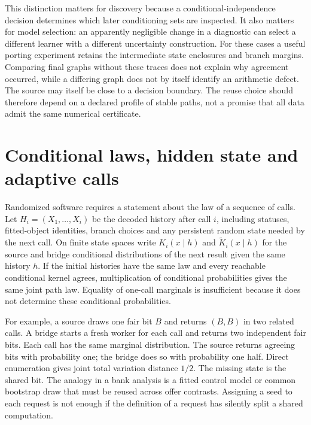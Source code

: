 This distinction matters for discovery because a conditional-independence
decision determines which later conditioning sets are inspected. It also
matters for model selection: an apparently negligible change in a diagnostic
can select a different learner with a different uncertainty construction.
For these cases a useful porting experiment retains the intermediate state
enclosures and branch margins. Comparing final graphs without these traces
does not explain why agreement occurred, while a differing graph does not by
itself identify an arithmetic defect. The source may itself be close to a
decision boundary. The reuse choice should therefore depend on a declared
profile of stable paths, not a promise that all data admit the same numerical
certificate.

\section{Conditional laws, hidden state and adaptive calls}
\label{exec17:s9-adaptive-kernels}

Randomized software requires a statement about the law of a sequence of calls.
Let $H_i=(X_1,\ldots,X_i)$ be the decoded history after call $i$, including
statuses, fitted-object identities, branch choices and any persistent random
state needed by the next call. On finite state spaces write
$K_i(x\mid h)$ and $\widetilde K_i(x\mid h)$ for the source and bridge
conditional distributions of the next result given the same history $h$.
If the initial histories have the same law and every reachable conditional
kernel agrees, multiplication of conditional probabilities gives the same
joint path law. Equality of one-call marginals is insufficient because it
does not determine these conditional probabilities.

For example, a source draws one fair bit $B$ and returns $(B,B)$ in two
related calls. A bridge starts a fresh worker for each call and returns two
independent fair bits. Each call has the same marginal distribution. The
source returns agreeing bits with probability one; the bridge does so with
probability one half. Direct enumeration gives joint total variation distance
$1/2$. The missing state is the shared bit. The analogy in a bank analysis is
a fitted control model or common bootstrap draw that must be reused across
offer contrasts. Assigning a seed to each request is not enough if the
definition of a request has silently split a shared computation.

